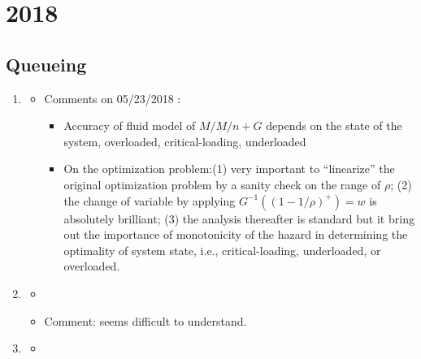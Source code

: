 \section{2018}
\subsection{Queueing}
\begin{enumerate}

\item \citet{bassamboo2010accuracy}
\begin{itemize}
\item Comments on 05/23/2018 :
\begin{itemize}
\item Accuracy of fluid model of $M/M/n+G$ depends on the state of the system, overloaded, critical-loading, underloaded
\item On the optimization problem:(1) very important to ``linearize'' the original optimization problem by a sanity check on the range of $\rho$; (2) the change of variable by applying $G^{-1}((1-1/\rho)^{+})=w$ is absolutely brilliant; (3) the analysis thereafter is standard but it bring out the importance of monotonicity of the hazard in determining the optimality of system state, i.e., critical-loading, underloaded, or overloaded.
\end{itemize}

\end{itemize}

\item \citet{zeltyn2005call}
\begin{itemize}
\item 
\item Comment: seems difficult to understand.
\end{itemize}


\item \citet{ward2005diffusion}
\begin{itemize}
    \item 
\end{itemize}

\end{enumerate}